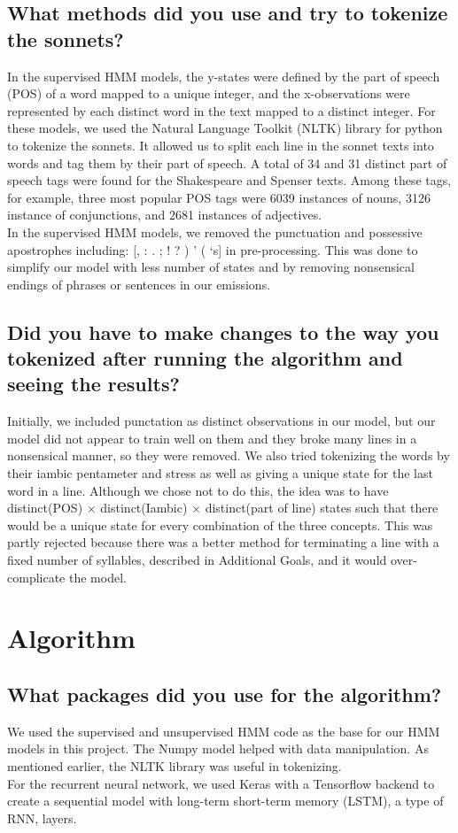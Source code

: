 \subsection{What methods did you use and try to tokenize the sonnets?}
In the supervised HMM models, the y-states were defined by the part of speech (POS) of a word mapped to a unique integer, and the x-observations were represented by each distinct word in the text mapped to a distinct integer. For these models, we used the Natural Language Toolkit (NLTK) library for python to tokenize the sonnets. It allowed us to split each line in the sonnet texts into words and tag them by their part of speech. A total of 34 and 31 distinct part of speech tags were found for the Shakespeare and Spenser texts. Among these tags, for example, three most popular POS tags were 6039 instances of nouns, 3126 instance of conjunctions, and 2681 instances of adjectives.\\
\indent In the supervised HMM models, we removed the punctuation and possessive apostrophes including: [, : . ; ! ? ) ' ( `s] in pre-processing. This was done to simplify our model with less number of states and by removing nonsensical endings of phrases or sentences in our emissions.
\subsection{Did you have to make changes to the way you tokenized after running the algorithm and seeing the results?}
Initially, we included punctation as distinct observations in our model, but our model did not appear to train well on them and they broke many lines in a nonsensical manner, so they were removed. We also tried tokenizing the words  by their iambic pentameter and stress as well as giving a unique state for the last word in a line. Although we chose not to do this, the idea was to have distinct(POS) $\times$ distinct(Iambic) $\times$ distinct(part of line) states such that there would be a unique state for every combination of the three concepts. This was partly rejected because there was a better method for terminating a line with a fixed number of syllables, described in Additional Goals, and it would over-complicate the model.

\section{Algorithm}
\medskip
\subsection{What packages did you use for the algorithm?}
We used the supervised and unsupervised HMM code as the base for our HMM models in this project. The Numpy model helped with data manipulation. As mentioned earlier, the NLTK library was useful in tokenizing.\\
\indent For the recurrent neural network, we used Keras with a Tensorflow backend to create a sequential model with long-term short-term memory (LSTM), a type of RNN, layers.
